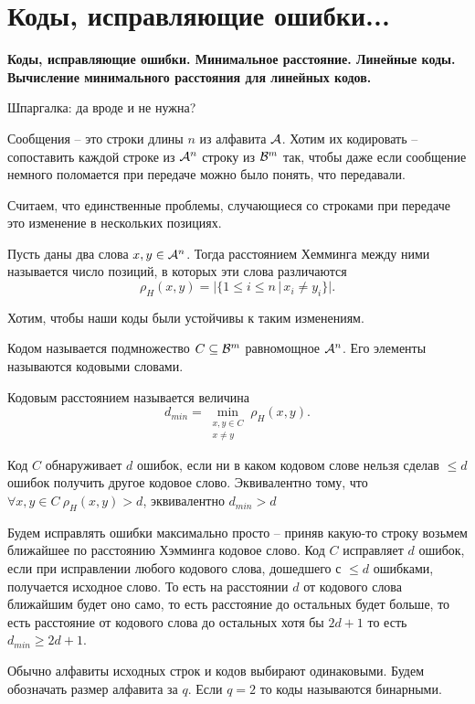 \section{
    Коды, исправляющие ошибки...
}

\textbf{Коды, исправляющие ошибки. Минимальное расстояние. Линейные коды. Вычисление минимального расстояния для линейных кодов.}

Шпаргалка: да вроде и не нужна? %



Сообщения -- это строки длины $n$ из алфавита $\mathcal{A}$. Хотим их кодировать -- сопоставить каждой строке из $\mathcal{A}^n$ строку из $\mathcal{B}^m$ так, чтобы даже если сообщение немного поломается при передаче можно было понять, что передавали.

Считаем, что единственные проблемы, случающиеся со строками при передаче это изменение в нескольких позициях. 

 Пусть даны два слова $x,y \in \mathcal{A}^n$. Тогда расстоянием Хемминга между ними называется число позиций, в которых эти слова различаются
$$\rho_H(x,y)=|\{1\leq i \leq n \, |\, x_i \neq y_i \}|.$$
\edfn

Хотим, чтобы наши коды были устойчивы к таким изменениям.

\dfn Кодом называется подмножество $C \subseteq \mathcal{B}^m$ равномощное $\mathcal{A}^n$. Его элементы называются кодовыми словами.
\edfn

\dfn Кодовым расстоянием называется величина
$$d_{min}= \min_{\substack{x,y\in C \\ x \neq y}} \rho_H(x,y).$$
\edfn

\dfn Код $C$ обнаруживает $d$ ошибок, если ни в каком кодовом слове нельзя сделав $\le d$ ошибок получить другое кодовое слово. Эквивалентно тому, что $\forall x, y \in C\ \rho_H(x, y) > d$, эквивалентно $d_{min} > d$
\edfn

\dfn Будем исправлять ошибки максимально просто -- приняв какую-то строку возьмем ближайшее по расстоянию Хэмминга кодовое слово. Код $C$ исправляет $d$ ошибок, если при исправлении любого кодового слова, дошедшего с $\le d$ ошибками, получается исходное слово. То есть на расстоянии $d$ от кодового слова ближайшим будет оно само, то есть расстояние до остальных будет больше, то есть расстояние от кодового слова до остальных хотя бы $2d+1$ то есть $d_{min} \ge 2d+1$.
\edfn

Обычно алфавиты исходных строк и кодов выбирают одинаковыми. Будем обозначать размер алфавита за $q$. Если $q=2$ то коды называются бинарными.
 
